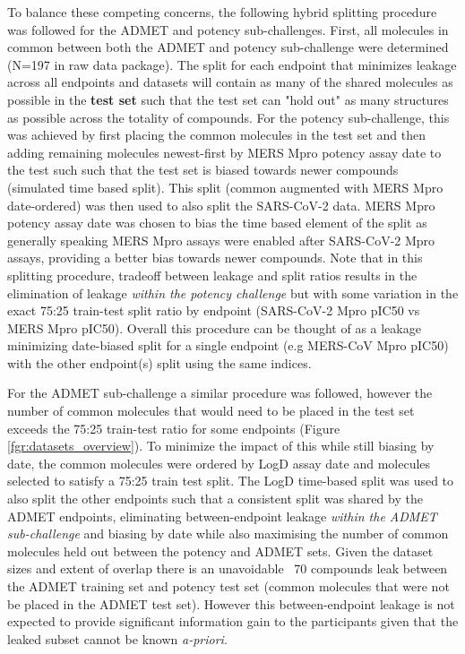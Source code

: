 \documentclass[journal=jcim,manuscript=article]{achemso}
\begin{document}
To balance these competing concerns, the following hybrid splitting procedure was followed for the ADMET and potency sub-challenges. First, all molecules in common between both the ADMET and potency sub-challenge were determined (N=197 in raw data package). The split for each endpoint that minimizes leakage across all endpoints and datasets will contain as many of the shared molecules as possible in the \textbf{test set} such that the test set can "hold out" as many structures as possible across the totality of compounds. For the potency sub-challenge, this was achieved by first placing the common molecules in the test set and then adding remaining molecules newest-first by MERS Mpro potency assay date to the test such such that the test set is biased towards newer compounds (simulated time based split). This split (common augmented with MERS Mpro date-ordered) was then used to also split the SARS-CoV-2 data.   MERS Mpro potency assay date was chosen to bias the time based element of the split as generally speaking MERS Mpro assays were enabled after SARS-CoV-2 Mpro assays, providing a better bias towards newer compounds. Note that in this splitting procedure, tradeoff between leakage and split ratios results in the elimination of leakage \textit{within the potency challenge} but with some variation in the exact 75:25 train-test split ratio by endpoint (SARS-CoV-2 Mpro pIC50 vs MERS Mpro pIC50). Overall this procedure can be thought of as a leakage minimizing date-biased split for a single endpoint (e.g MERS-CoV Mpro pIC50) with the other endpoint(s) split using the same indices.

For the ADMET sub-challenge a similar procedure was followed, however the number of common molecules that would need to be placed in the test set exceeds the 75:25 train-test ratio for some endpoints (Figure \ref{fgr:datasets_overview}). To minimize the impact of this while still biasing by date, the common molecules were ordered by LogD assay date and molecules selected to satisfy a 75:25 train test split. The LogD time-based split was used to also split the other endpoints such that a consistent split was shared by the ADMET endpoints, eliminating between-endpoint leakage \textit{within the ADMET sub-challenge} and biasing by date while also maximising the number of common molecules held out between the potency and ADMET sets. Given the dataset sizes and extent of overlap there is an unavoidable ~70 compounds leak between the ADMET training set and potency test set (common molecules that were not be placed in the ADMET test set). However this between-endpoint leakage is not expected to provide significant information gain to the participants given that the leaked subset cannot be known \textit{a-priori}.
\end{document}
